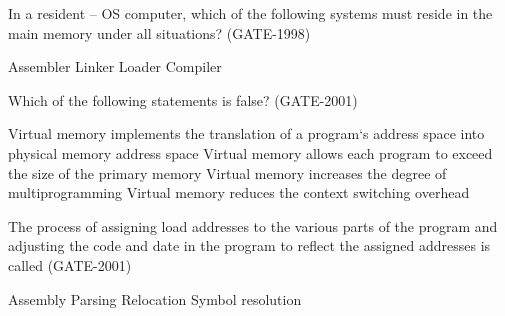 
\begin{questyle}

  \question In a resident – OS computer, which of the following systems must reside in the main memory under all situations?  (GATE-1998)

  \begin{oneparchoices}
    \choice Assembler
    \choice Linker
    \correctchoice Loader
    \choice Compiler
  \end{oneparchoices}

\end{questyle}



\begin{questyle}

  \question  Which of the following statements is false? (GATE-2001)

  \begin{choices}
    \choice Virtual memory implements the translation of a program‘s address space into physical memory address space
    \choice Virtual memory allows each program to exceed the size of the primary memory
    \choice Virtual memory increases the degree of multiprogramming
    \correctchoice Virtual memory reduces the context switching overhead
  \end{choices}

\end{questyle}


\begin{questyle}

  \question  The process of assigning load addresses to the various parts of the program and adjusting the code and date in the program to reflect the assigned addresses is called (GATE-2001)

  \begin{oneparchoices}
    \choice Assembly
    \choice Parsing
    \correctchoice Relocation
    \choice Symbol resolution
  \end{oneparchoices}

\end{questyle}


